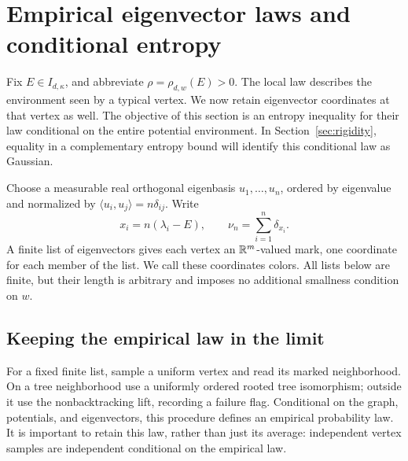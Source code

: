 \section{Empirical eigenvector laws and conditional entropy}\label{sec:entropy}

Fix \(E\in I_{d,\kappa}\), and abbreviate
\(\rho=\rho_{d,w}(E)>0\).  The local law describes the environment seen
by a typical vertex.  We now retain eigenvector coordinates at that
vertex as well.  The objective of this section is an entropy inequality
for their law conditional on the entire potential environment.  In
Section~\ref{sec:rigidity}, equality in a complementary entropy bound
will identify this conditional law as Gaussian.

Choose a measurable real orthogonal eigenbasis \(u_1,\ldots,u_n\),
ordered by eigenvalue and normalized by
\(\langle u_i,u_j\rangle=n\delta_{ij}\).  Write
\begin{equation}\label{eq:microscopic-positions}
 x_i=n(\lambda_i-E),\qquad \nu_n=\sum_{i=1}^n\delta_{x_i}.
\end{equation}
A finite list of eigenvectors gives each vertex an \(\mathbb R^m\)-valued
mark, one coordinate for each member of the list.  We call these
coordinates colors.  All lists below are finite, but their length is
arbitrary and imposes no additional smallness condition on \(w\).

\subsection{Keeping the empirical law in the limit}

For a fixed finite list, sample a uniform vertex and read its marked
neighborhood.  On a tree neighborhood use a uniformly ordered rooted
tree isomorphism; outside it use the nonbacktracking lift, recording a
failure flag.  Conditional on the graph, potentials, and eigenvectors,
this procedure defines an empirical probability law.  It is important
to retain this law, rather than just its average: independent vertex
samples are independent conditional on the empirical law.

